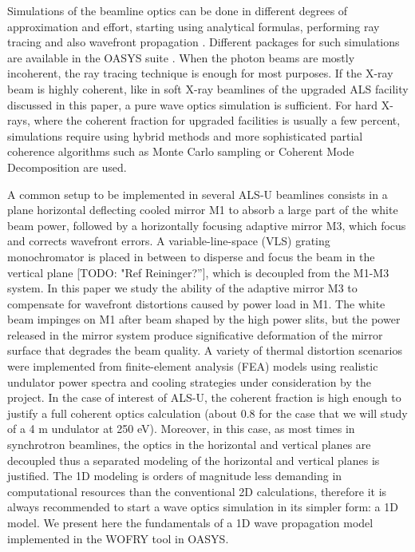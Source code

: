 \documentclass[]{spie}  %
\newcommand{\todo}[1]{{\color{red}[TODO: "#1'']}}
\begin{document}
Simulations of the beamline optics can be done in different degrees of approximation and effort, starting using analytical formulas, performing ray tracing and also wavefront propagation \cite{hyerarchical}. Different packages for such simulations are available in the OASYS suite \cite{codeOASYS}. When the photon beams are mostly incoherent, the ray tracing technique is enough for most purposes. If the X-ray beam is highly coherent, like in soft X-ray beamlines of the upgraded ALS facility discussed in this paper, a pure wave optics simulation is sufficient. For 
hard X-rays, where the coherent fraction for upgraded facilities is usually a few percent, simulations require using hybrid methods \cite{hybrid} and more sophisticated partial coherence algorithms such as Monte Carlo sampling \cite{Chubar2011b} or Coherent Mode Decomposition \cite{codeCOMSYL} are used. 



A common setup to be implemented in several ALS-U beamlines consists in a plane horizontal deflecting cooled mirror M1 to absorb a large part of the white beam power, followed by a horizontally focusing adaptive mirror M3, which focus and corrects wavefront errors. A variable-line-space (VLS) grating monochromator is placed in between to disperse and focus the beam in the vertical plane \todo{Ref Reininger?}, which is decoupled from the M1-M3 system. In this paper we study the ability of the adaptive mirror M3 to compensate for wavefront distortions caused by power load in M1. The white beam impinges on M1 after beam shaped by the high power slits, but the power released in the mirror system produce significative deformation of the mirror surface that degrades the beam quality. 
A variety of thermal distortion scenarios were implemented from finite-element analysis (FEA) models using realistic undulator power spectra and cooling strategies under consideration by the project.
In the case of interest of ALS-U, the coherent fraction is high enough  to justify a full coherent optics calculation (about 0.8 for the case that we will study of a 4 m undulator at 250 eV). Moreover, in this case, as most times in synchrotron beamlines, the optics in the horizontal and vertical planes are decoupled thus a separated modeling of the horizontal and vertical planes is justified. The 1D modeling is orders of magnitude less demanding in computational resources than the conventional 2D calculations, therefore it is always recommended to start a wave optics simulation in its simpler form: a 1D model. We present here the fundamentals of a 1D wave propagation model implemented in the WOFRY \cite{codeWOFRY} tool in OASYS. 
\end{document}
